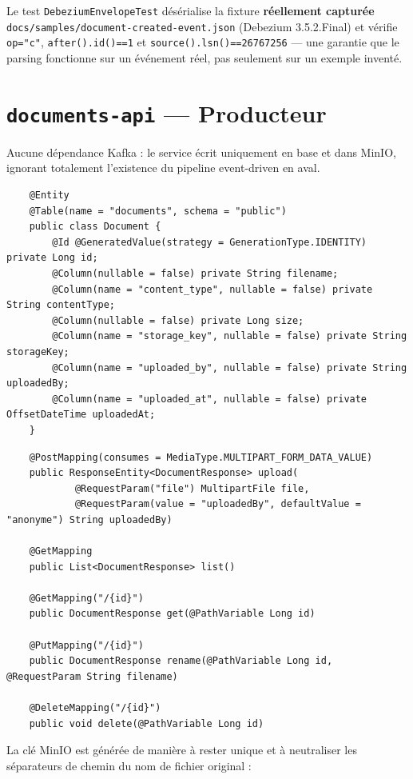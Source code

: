\documentclass[12pt,a4paper,openany]{report}
\begin{document}
    Le test \texttt{DebeziumEnvelopeTest} d\'es\'erialise la fixture \textbf{r\'eellement captur\'ee} \texttt{docs/samples/document-created-event.json} (Debezium 3.5.2.Final) et v\'erifie \texttt{op="c"}, \texttt{after().id()==1} et \texttt{source().lsn()==26767256} --- une garantie que le parsing fonctionne sur un \'ev\'enement r\'eel, pas seulement sur un exemple invent\'e.

    \section{\texttt{documents-api} --- Producteur}

    Aucune d\'ependance Kafka : le service \'ecrit uniquement en base et dans MinIO, ignorant totalement l'existence du pipeline event-driven en aval.

    \begin{lstlisting}
    @Entity
    @Table(name = "documents", schema = "public")
    public class Document {
        @Id @GeneratedValue(strategy = GenerationType.IDENTITY) private Long id;
        @Column(nullable = false) private String filename;
        @Column(name = "content_type", nullable = false) private String contentType;
        @Column(nullable = false) private Long size;
        @Column(name = "storage_key", nullable = false) private String storageKey;
        @Column(name = "uploaded_by", nullable = false) private String uploadedBy;
        @Column(name = "uploaded_at", nullable = false) private OffsetDateTime uploadedAt;
    }
    \end{lstlisting}

    \begin{lstlisting}
    @PostMapping(consumes = MediaType.MULTIPART_FORM_DATA_VALUE)
    public ResponseEntity<DocumentResponse> upload(
            @RequestParam("file") MultipartFile file,
            @RequestParam(value = "uploadedBy", defaultValue = "anonyme") String uploadedBy)

    @GetMapping
    public List<DocumentResponse> list()

    @GetMapping("/{id}")
    public DocumentResponse get(@PathVariable Long id)

    @PutMapping("/{id}")
    public DocumentResponse rename(@PathVariable Long id, @RequestParam String filename)

    @DeleteMapping("/{id}")
    public void delete(@PathVariable Long id)
    \end{lstlisting}

    La cl\'e MinIO est g\'en\'er\'ee de mani\`ere \`a rester unique et \`a neutraliser les s\'eparateurs de chemin du nom de fichier original :
\end{document}
